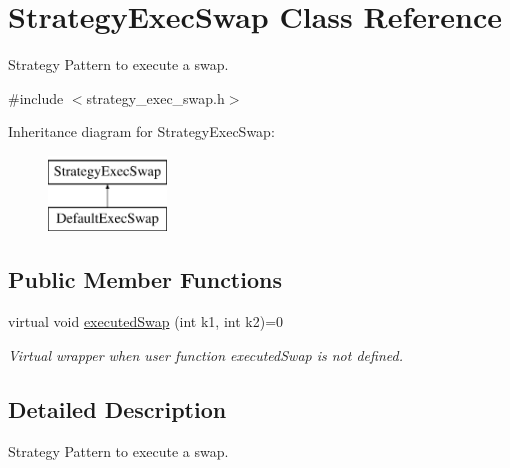 \hypertarget{classStrategyExecSwap}{\section{\-Strategy\-Exec\-Swap \-Class \-Reference}
\label{classStrategyExecSwap}
}


\-Strategy \-Pattern to execute a swap.  




{\ttfamily \#include $<$strategy\-\_\-exec\-\_\-swap.\-h$>$}

\-Inheritance diagram for \-Strategy\-Exec\-Swap\-:\begin{figure}[H]
\begin{center}
\leavevmode
\includegraphics[height=2.000000cm]{classStrategyExecSwap}
\end{center}
\end{figure}
\subsection*{\-Public \-Member \-Functions}
\begin{DoxyCompactItemize}
\item 
virtual void \hyperlink{classStrategyExecSwap_af233f7c89ae323aa30eb1c37c7dbe83c}{executed\-Swap} (int k1, int k2)=0
\begin{DoxyCompactList}\small\item\em \-Virtual wrapper when user function executed\-Swap is not defined. \end{DoxyCompactList}\end{DoxyCompactItemize}


\subsection{\-Detailed \-Description}
\-Strategy \-Pattern to execute a swap. 

